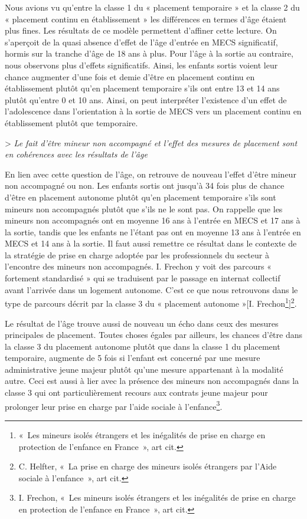 \documentclass[
  12,
  a4paper,
]{report}
\begin{document}
Nous avions vu qu'entre la classe 1 du « placement temporaire » et la
classe 2 du « placement continu en établissement » les différences en
termes d'âge étaient plus fines. Les résultats de ce modèle permettent
d'affiner cette lecture. On s'aperçoit de la quasi absence d'effet de
l'âge d'entrée en MECS significatif, hormis sur la tranche d'âge de 18
ans à plus. Pour l'âge à la sortie au contraire, nous observons plus
d'effets significatifs. Ainsi, les enfants sortis voient leur chance
augmenter d'une fois et demie d'être en placement continu en
établissement plutôt qu'en placement temporaire s'ils ont entre 13 et 14
ans plutôt qu'entre 0 et 10 ans. Ainsi, on peut interpréter l'existence
d'un effet de l'adolescence dans l'orientation à la sortie de MECS vers
un placement continu en établissement plutôt que temporaire.

\textgreater{} \emph{Le fait d'être mineur non accompagné et l'effet des
mesures de placement sont en cohérences avec les résultats de l'âge}

En lien avec cette question de l'âge, on retrouve de nouveau l'effet
d'être mineur non accompagné ou non. Les enfants sortis ont jusqu'à 34
fois plus de chance d'être en placement autonome plutôt qu'en placement
temporaire s'ils sont mineurs non accompagnés plutôt que s'ils ne le
sont pas. On rappelle que les mineurs non accompagnés ont en moyenne 16
ans à l'entrée en MECS et 17 ans à la sortie, tandis que les enfants ne
l'étant pas ont en moyenne 13 ans à l'entrée en MECS et 14 ans à la
sortie. Il faut aussi remettre ce résultat dans le contexte de la
stratégie de prise en charge adoptée par les professionnels du secteur à
l'encontre des mineurs non accompagnés. I. Frechon y voit des parcours «
fortement standardisé » qui se traduisent par le passage en internat
collectif avant l'arrivée dans un logement autonome. C'est ce que nous
retrouvons dans le type de parcours décrit par la classe 3 du «
placement autonome »{[}I. Frechon\footnote{{«~Les mineurs isolés
  étrangers et les inégalités de prise en charge en protection de
  l'enfance en France~»}, art cit.}{]}\footnote{C. Helfter, {«~La prise
  en charge des mineurs isolés étrangers par l'Aide sociale à
  l'enfance~»}, art cit.}.

Le résultat de l'âge trouve aussi de nouveau un écho dans ceux des
mesures principales de placement. Toutes choses égales par ailleurs, les
chances d'être dans la classe 3 du placement autonome plutôt que dans la
classe 1 du placement temporaire, augmente de 5 fois si l'enfant est
concerné par une mesure administrative jeune majeur plutôt qu'une mesure
appartenant à la modalité autre. Ceci est aussi à lier avec la présence
des mineurs non accompagnés dans la classe 3 qui ont particulièrement
recours aux contrats jeune majeur pour prolonger leur prise en charge
par l'aide sociale à l'enfance\footnote{I. Frechon, {«~Les mineurs
  isolés étrangers et les inégalités de prise en charge en protection de
  l'enfance en France~»}, art cit.}.
\end{document}
